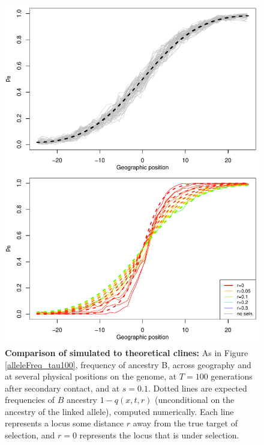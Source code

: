 \begin{figure}
    \includegraphics{figs/alleleFrequencies_sim_comparison}
    \caption{
        \textbf{Comparison of simulated to theoretical clines:}
        As in Figure \ref{alleleFreq_tau100},
        frequency of ancestry B,
        across geography and at several physical positions on the genome,
        at $T=100$ generations after secondary contact,
        and at $s=0.1$.
        Dotted lines are expected frequencies of $B$ ancestry $1-q(x,t,r)$
        (unconditional on the ancestry of the linked allele), computed numerically.
        Each line represents a locus some distance $r$ away from the true target of selection, 
        and $r=0$ represents the locus that is under selection.    }\label{sfig:alleleFreq_tau100_comparison}
\end{figure}




